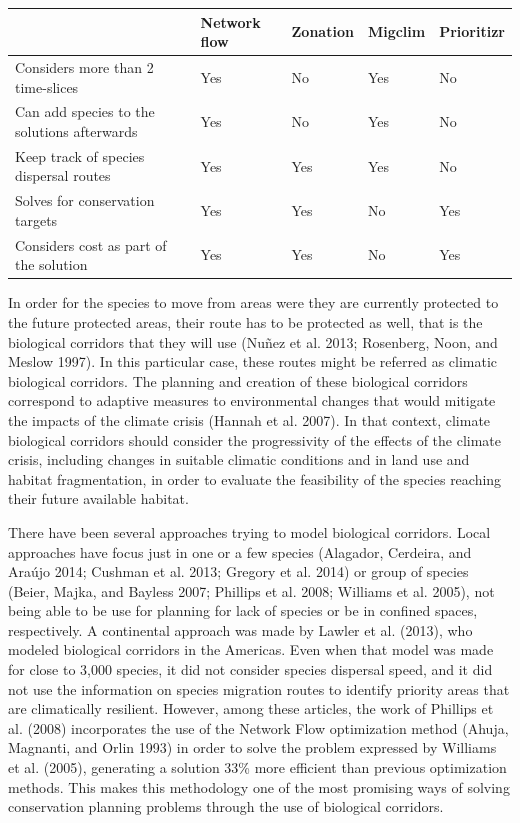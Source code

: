 \documentclass[]{article}
\begin{document}
\begin{table}[H]
\centering
\begin{tabular}{lllll}
\toprule
 & Network flow & Zonation & Migclim & Prioritizr\\
\midrule
Considers more than 2 time-slices & Yes & No & Yes & No\\
Can add species to the solutions afterwards & Yes & No & Yes & No\\
Keep track of species dispersal routes & Yes & Yes & Yes & No\\
Solves for conservation targets & Yes & Yes & No & Yes\\
Considers cost as part of the solution & Yes & Yes & No & Yes\\
\bottomrule
\end{tabular}
\end{table}

In order for the species to move from areas were they are currently protected to the future protected areas, their route has to be protected as well, that is the biological corridors that they will use (Nuñez et al. 2013; Rosenberg, Noon, and Meslow 1997). In this particular case, these routes might be referred as climatic biological corridors. The planning and creation of these biological corridors correspond to adaptive measures to environmental changes that would mitigate the impacts of the climate crisis (Hannah et al. 2007). In that context, climate biological corridors should consider the progressivity of the effects of the climate crisis, including changes in suitable climatic conditions and in land use and habitat fragmentation, in order to evaluate the feasibility of the species reaching their future available habitat.

There have been several approaches trying to model biological corridors. Local approaches have focus just in one or a few species (Alagador, Cerdeira, and Araújo 2014; Cushman et al. 2013; Gregory et al. 2014) or group of species (Beier, Majka, and Bayless 2007; Phillips et al. 2008; Williams et al. 2005), not being able to be use for planning for lack of species or be in confined spaces, respectively. A continental approach was made by Lawler et al. (2013), who modeled biological corridors in the Americas. Even when that model was made for close to 3,000 species, it did not consider species dispersal speed, and it did not use the information on species migration routes to identify priority areas that are climatically resilient. However, among these articles, the work of Phillips et al. (2008) incorporates the use of the Network Flow optimization method (Ahuja, Magnanti, and Orlin 1993) in order to solve the problem expressed by Williams et al. (2005), generating a solution 33\% more efficient than previous optimization methods. This makes this methodology one of the most promising ways of solving conservation planning problems through the use of biological corridors.
\end{document}

